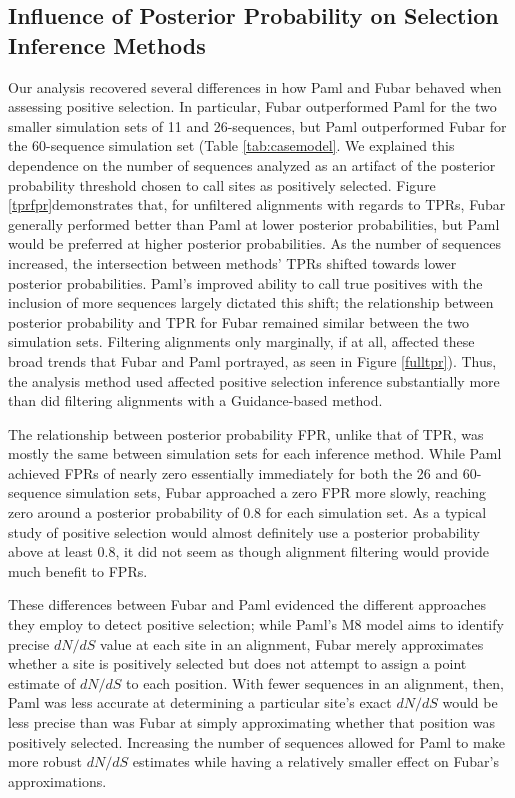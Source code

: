 \documentclass[10pt]{article}
\begin{document}
\subsection*{Influence of Posterior Probability on Selection Inference Methods}

Our analysis recovered several differences in how Paml and Fubar behaved when assessing positive selection. In particular, Fubar outperformed Paml for the two smaller simulation sets of 11 and 26-sequences, but Paml outperformed Fubar for the 60-sequence simulation set (Table \ref{tab:casemodel}. We explained this dependence on the number of sequences analyzed as an artifact of the posterior probability threshold chosen to call sites as positively selected. Figure \ref{tprfpr}demonstrates that, for unfiltered alignments with regards to TPRs, Fubar generally performed better than Paml at lower posterior probabilities, but Paml would be preferred at higher posterior probabilities. As the number of sequences increased, the intersection between methods' TPRs shifted towards lower posterior probabilities. Paml's improved ability to call true positives with the inclusion of more sequences largely dictated this shift; the relationship between posterior probability and TPR for Fubar remained similar between the two simulation sets.  Filtering alignments only marginally, if at all, affected these broad trends that Fubar and Paml portrayed, as seen in Figure \ref{fulltpr}). Thus, the analysis method used affected positive selection inference substantially more than did filtering  alignments with a Guidance-based method.

The relationship between posterior probability FPR, unlike that of TPR, was mostly the same between simulation sets for each inference method. While Paml achieved FPRs of nearly zero essentially immediately for both the 26 and 60-sequence simulation sets, Fubar approached a zero FPR more slowly, reaching zero around a posterior probability of 0.8 for each simulation set. As a typical study of positive selection would almost definitely use a posterior probability above at least 0.8, it did not seem as though alignment filtering would provide much benefit to FPRs.

These differences between Fubar and Paml evidenced the different approaches they employ to detect positive selection; while Paml's M8 model aims to identify precise $dN/dS$ value at each site in an alignment, Fubar merely approximates whether a site is positively selected but does not attempt to assign a point estimate of $dN/dS$ to each position. With fewer sequences in an alignment, then, Paml was less accurate at determining  a particular site's exact $dN/dS$ would be less precise than was Fubar at simply approximating whether that position was positively selected. Increasing the number of sequences allowed for Paml to make more robust $dN/dS$ estimates while having a relatively smaller effect on Fubar's approximations.
\end{document}
